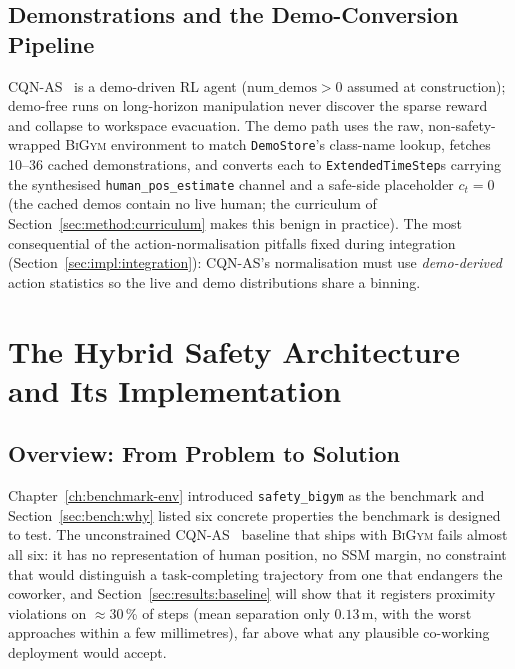 \documentclass[11pt,a4paper]{report}
\newcommand{\ssm}{SSM}
\newcommand{\bigym}{\textsc{BiGym}}
\newcommand{\sbigym}{\texttt{safety\_bigym}}
\newcommand{\cqnas}{CQN-AS}
\begin{document}
\section{Demonstrations and the Demo-Conversion Pipeline}
\label{sec:bench:demos}

\cqnas{}~\cite{seo2024cqnas} is a demo-driven RL agent
($\text{num\_demos} > 0$ assumed at construction); demo-free runs on
long-horizon manipulation never discover the sparse reward and
collapse to workspace evacuation. The demo path uses the raw,
non-safety-wrapped \bigym{} environment to match
\texttt{DemoStore}'s class-name lookup, fetches 10--36 cached
demonstrations, and converts each to \texttt{ExtendedTimeStep}s
carrying the synthesised \texttt{human\_pos\_estimate} channel and a
safe-side placeholder $c_t = 0$ (the cached demos contain no live
human; the curriculum of Section~\ref{sec:method:curriculum} makes
this benign in practice). The most consequential of the
action-normalisation pitfalls fixed during integration
(Section~\ref{sec:impl:integration}): \cqnas{}'s normalisation must
use \emph{demo-derived} action statistics so the live and demo
distributions share a binning.

\chapter{The Hybrid Safety Architecture and Its Implementation}
\label{ch:method}

\section{Overview: From Problem to Solution}
\label{sec:method:overview}

Chapter~\ref{ch:benchmark-env} introduced \sbigym{} as the
benchmark and Section~\ref{sec:bench:why} listed six concrete
properties the benchmark is designed to test. The unconstrained
\cqnas{}~\cite{seo2024cqnas} baseline that ships with \bigym{}
fails almost all six: it has no representation of human position,
no \ssm{} margin, no constraint that would distinguish a
task-completing trajectory from one that endangers the coworker,
and Section~\ref{sec:results:baseline} will show that it registers
proximity violations on $\approx$30\,\% of steps (mean separation only
$0.13$\,m, with the worst approaches within a few millimetres), far
above what any plausible co-working deployment would accept.
\end{document}
